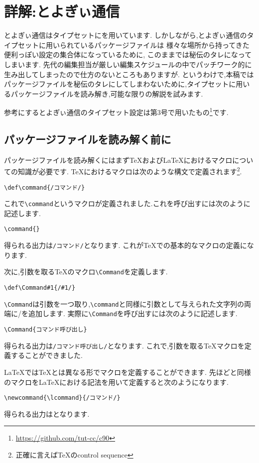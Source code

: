 \newcommand*{\reflisting}[1]{\lstlistingname\ref{#1}}
\renewcommand*\descriptionlabel[1]{\normalfont\headfont #1 :\hfil}

\chapter{詳解:とよぎぃ通信}

とよぎぃ通信はタイプセットに{\pLaTeX}を用いています.
しかしながら,とよぎぃ通信のタイプセットに用いられているパッケージファイルは
様々な場所から持ってきた便利っぽい設定の集合体になっているために,
このままでは秘伝のタレになってしまいます.
先代の編集担当が厳しい編集スケジュールの中でパッチワーク的に生み出してしまったので仕方のないところもありますが.
というわけで,本稿ではパッケージファイルを秘伝のタレにしてしまわないために,タイプセットに用いるパッケージファイルを読み解き,可能な限りの解説を試みます.

参考にするとよぎぃ通信のタイプセット設定は第3号で用いたもの\footnote{\url{https://github.com/tut-cc/c90}}です.

\section{パッケージファイルを読み解く前に}
{
\def\command{/コマンド/}
\def\Command#1{/#1/}
\newcommand{\lcommand}{/コマンド/}

パッケージファイルを読み解くにはまず{\TeX}および{\LaTeX}におけるマクロについての知識が必要です.
{\TeX}におけるマクロは次のような構文で定義されます\footnote{正確に言えば{\TeX}のcontrol sequence}.
\begin{verbatim}
\def\command{/コマンド/}
\end{verbatim}

これで\verb|\command|というマクロが定義されました.これを呼び出すには次のように記述します.
\begin{verbatim}
\command{}
\end{verbatim}
得られる出力は\texttt{\command{}}となります.
これが{\TeX}での基本的なマクロの定義になります.

次に,引数を取る{\TeX}のマクロ\verb|\Command|を定義します.
\begin{verbatim}
\def\Command#1{/#1/}
\end{verbatim}
\verb|\Command|は引数を一つ取り,\verb|\command|と同様に引数として与えられた文字列の両端に/を追加します.
実際に\verb|\Command|を呼び出すには次のように記述します.
\begin{verbatim}
\Command{コマンド呼び出し}
\end{verbatim}
得られる出力は\texttt{\Command{コマンド呼び出し}}となります.
これで,引数を取る{\TeX}マクロを定義することができました.

{\LaTeX}では{\TeX}とは異なる形でマクロを定義することができます.
先ほどと同様のマクロを{\LaTeX}における記法を用いて定義すると次のようになります.
\begin{verbatim}
\newcommand{\lcommand}{/コマンド/}
\end{verbatim}
}
得られる出力は\texttt{\lcommand}となります.

